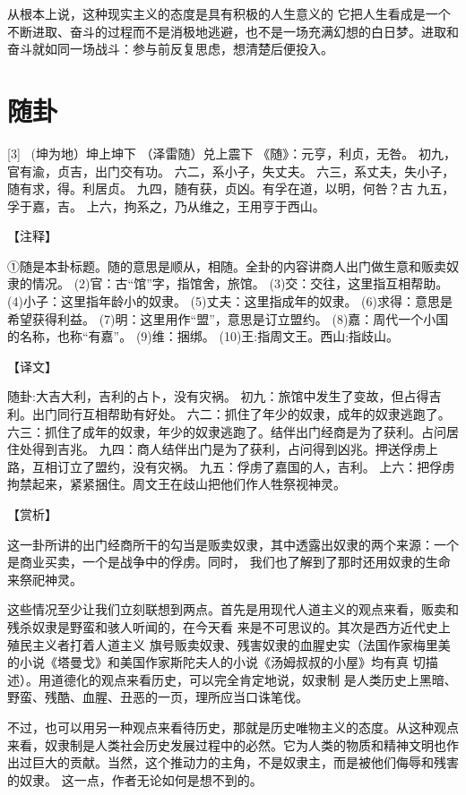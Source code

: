\documentclass[12pt,UTF8]{ctexbook}
\begin{document}
从根本上说，这种现实主义的态度是具有积极的人生意义的 它把人生看成是一个不断进取、奋斗的过程而不是消极地逃避，也不是一场充满幻想的白日梦。进取和奋斗就如同一场战斗：参与前反复思虑，想清楚后便投入。

\chapter{随卦}
[3] \ (坤为地）坤上坤下
（泽雷随）兑上震下
《随》：元亨，利贞，无咎。
初九，官有渝，贞吉，出门交有功。
六二，系小子，失丈夫。
六三，系丈夫，失小子，随有求，得。利居贞。
九四，随有获，贞凶。有孚在道，以明，何咎？古
九五，孚于嘉，吉。
上六，拘系之，乃从维之，王用亨于西山。

【注释】

①随是本卦标题。随的意思是顺从，相随。全卦的内容讲商人出门做生意和贩卖奴隶的情况。
(2)官：古“馆”字，指馆舍，旅馆。
(3)交：交往，这里指互相帮助。
(4)小子：这里指年龄小的奴隶。
(5)丈夫：这里指成年的奴隶。
(6)求得：意思是希望获得利益。
(7)明：这里用作“盟”，意思是订立盟约。
(8)嘉：周代一个小国的名称，也称“有嘉”。
(9)维：捆绑。
(10)王:指周文王。西山:指歧山。

【译文】

随卦:大吉大利，吉利的占卜，没有灾祸。
初九：旅馆中发生了变故，但占得吉利。出门同行互相帮助有好处。
六二：抓住了年少的奴隶，成年的奴隶逃跑了。
六三：抓住了成年的奴隶，年少的奴隶逃跑了。结伴出门经商是为了获利。占问居住处得到吉兆。
九四：商人结伴出门是为了获利，占问得到凶兆。押送俘虏上路，互相订立了盟约，没有灾祸。
九五：俘虏了嘉国的人，吉利。
上六：把俘虏拘禁起来，紧紧捆住。周文王在歧山把他们作人牲祭视神灵。

【赏析】

这一卦所讲的出门经商所干的勾当是贩卖奴隶，其中透露出奴隶的两个来源：一个是商业买卖，一个是战争中的俘虏。同时， 我们也了解到了那时还用奴隶的生命来祭祀神灵。

这些情况至少让我们立刻联想到两点。首先是用现代人道主义的观点来看，贩卖和残杀奴隶是野蛮和骇人听闻的，在今天看 来是不可思议的。其次是西方近代史上殖民主义者打着人道主义 旗号贩卖奴隶、残害奴隶的血腥史实（法国作家梅里美的小说《塔曼戈》和美国作家斯陀夫人的小说《汤姆叔叔的小屋》均有真 切描述）。用道德化的观点来看历史，可以完全肯定地说，奴隶制 是人类历史上黑暗、野蛮、残酷、血腥、丑恶的一页，理所应当口诛笔伐。

不过，也可以用另一种观点来看待历史，那就是历史唯物主义的态度。从这种观点来看，奴隶制是人类社会历史发展过程中的必然。它为人类的物质和精神文明也作出过巨大的贡献。当然，这个推动力的主角，不是奴隶主，而是被他们侮辱和残害的奴隶。 这一点，作者无论如何是想不到的。
\end{document}

